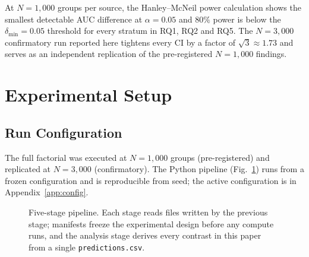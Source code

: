 \documentclass[10pt,twocolumn,a4paper]{article}
\DeclareRobustCommand{\by}[1]{\textnormal{\normalfont\footnotesize\space--- #1}}
\begin{document}
At $N\!=\!1{,}000$ groups per source, the Hanley--McNeil power calculation shows the smallest detectable AUC difference at $\alpha\!=\!0.05$ and $80\%$ power is below the $\delta_\text{min}\!=\!0.05$ threshold for every stratum in RQ1, RQ2 and RQ5. The $N\!=\!3{,}000$ confirmatory run reported here tightens every CI by a factor of $\sqrt{3}\!\approx\!1.73$ and serves as an independent replication of the pre-registered $N\!=\!1{,}000$ findings.

\section[Experimental Setup\by{\textbf{Writer:} Abdul Moiz Akbar  \textbf{Reviewer:} Daria \textbf{Contributor:}  Nico}]{Experimental Setup }
\label{sec:experiments}

\subsection{Run Configuration}
The full factorial was executed at $N\!=\!1{,}000$ groups (pre-registered) and replicated at $N\!=\!3{,}000$ (confirmatory). The Python pipeline (Fig.~\ref{fig:pipeline}) runs from a frozen configuration and is reproducible from seed; the active configuration is in Appendix~\ref{app:config}.

\begin{figure}[t]
\centering
{}
\caption{Five-stage pipeline. Each stage reads files written by the previous stage; manifests freeze the experimental design before any compute runs, and the analysis stage derives every contrast in this paper from a single \texttt{predictions.csv}.}
\label{fig:pipeline}
\end{figure}
\end{document}
